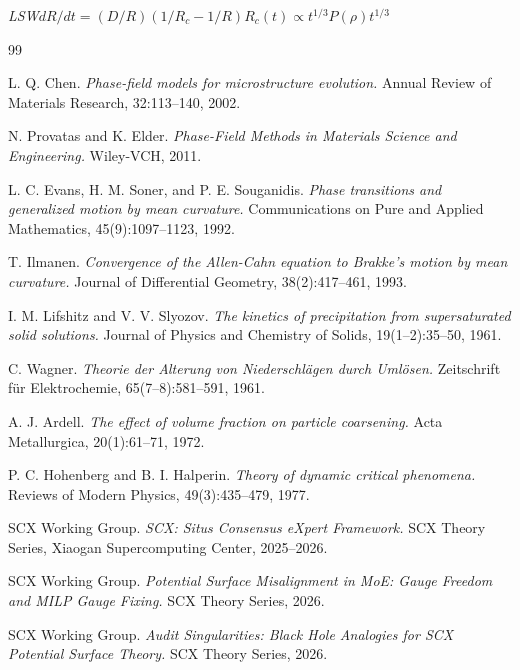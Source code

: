 \documentclass[12pt,a4paper]{article}
\theoremstyle{plain}
\theoremstyle{definition}
\newcommand{\cn}[1]{\textcolor{scxgray}{\textit{#1}}}
\begin{document}
\bigskip
\noindent
\cn{LSW$dR/dt = (D/R)(1/R_c-1/R)$$R_c(t)\propto t^{1/3}$$P(\rho)$$t^{1/3}$}

\begin{thebibliography}{99}

L. Q. Chen.
\textit{Phase-field models for microstructure evolution.}
Annual Review of Materials Research, 32:113--140, 2002.

N. Provatas and K. Elder.
\textit{Phase-Field Methods in Materials Science and Engineering.}
Wiley-VCH, 2011.

L. C. Evans, H. M. Soner, and P. E. Souganidis.
\textit{Phase transitions and generalized motion by mean curvature.}
Communications on Pure and Applied Mathematics, 45(9):1097--1123, 1992.

T. Ilmanen.
\textit{Convergence of the Allen-Cahn equation to Brakke's motion by mean curvature.}
Journal of Differential Geometry, 38(2):417--461, 1993.

I. M. Lifshitz and V. V. Slyozov.
\textit{The kinetics of precipitation from supersaturated solid solutions.}
Journal of Physics and Chemistry of Solids, 19(1--2):35--50, 1961.

C. Wagner.
\textit{Theorie der Alterung von Niederschl\"agen durch Uml\"osen.}
Zeitschrift f\"ur Elektrochemie, 65(7--8):581--591, 1961.

A. J. Ardell.
\textit{The effect of volume fraction on particle coarsening.}
Acta Metallurgica, 20(1):61--71, 1972.

P. C. Hohenberg and B. I. Halperin.
\textit{Theory of dynamic critical phenomena.}
Reviews of Modern Physics, 49(3):435--479, 1977.

SCX Working Group.
\textit{SCX: Situs Consensus eXpert Framework.}
SCX Theory Series, Xiaogan Supercomputing Center, 2025--2026.

SCX Working Group.
\textit{Potential Surface Misalignment in MoE: Gauge Freedom and MILP Gauge Fixing.}
SCX Theory Series, 2026.

SCX Working Group.
\textit{Audit Singularities: Black Hole Analogies for SCX Potential Surface Theory.}
SCX Theory Series, 2026.

\end{thebibliography}

\end{document}
